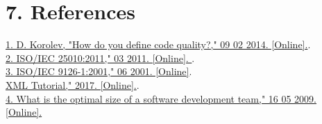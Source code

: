 \documentclass[letterpaper, 11pt]{report}
\begin{document}
\clearpage
{}
\section*{7. References}
 \href{https://www.quora.com/How-do-you-define-code-quality}{1. D. Korolev, "How do you define code quality?," 09 02 2014. [Online].}.\\
 \href{http://www.iso.org/iso/catalogue_detail.htm?csnumber=35733}{2. ISO/IEC 25010:2011," 03 2011. [Online]. }.\\
 \href{http://www.iso.org/iso/catalogue_detail.htm?csnumber=22749}{3. ISO/IEC 9126-1:2001," 06 2001. [Online]}.\\
 \href{http://www.w3schools.com/xml/}{XML Tutorial," 2017. [Online].}.\\
 \href{http://stackoverflow.com/questions/872103/what-is-the-optimal-size-of-a-software-develo}{4. What is the optimal size of a software development team," 16 05 2009. [Online].}\\
\end{document}
